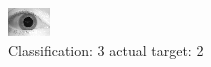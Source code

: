 \begin{figure}[h!]
\begin{center}
\includegraphics[width=0.60\columnwidth]{figures/ID1698_class_3_target_2.png}
\end{center}
\caption{ Classification: 3 actual target: 2}
\label{fig:ID1698_class_3_target_2}
\end{figure}
